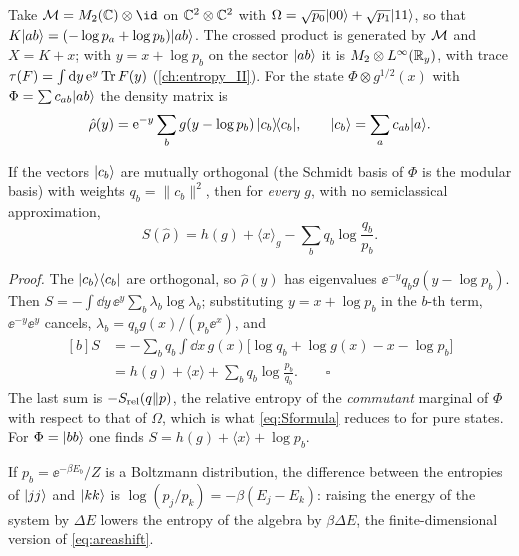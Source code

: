 Take $\M=M_2(\C)\otimes\id$ on $\mathbb{C}^2\otimes\mathbb{C}^2$ with $\Omega=\sqrt{p_0}\lvert 00\rangle+\sqrt{p_1}\lvert 11\rangle$, so that $K\lvert ab\rangle=(-\log p_a+\log p_b)\lvert ab\rangle$. The crossed product is generated by $\mathcal{M}$ and $X=K+x$; with $y=x+\log p_b$ on the sector $\lvert ab\rangle$ it is $M_2\otimes L^\infty(\mathbb{R}_y)$, with trace $\tau(F)=\int\mathrm{d} y\,\mathrm{e}^{y}\operatorname{Tr} F(y)$ (\cref{ch:entropy_II}). For the state $\Phi\otimes g^{1/2}(x)$ with $\Phi=\sum c_{ab}\lvert ab\rangle$ the density matrix is
\begin{equation}
\hat\rho(y)=\mathrm{e}^{-y}\sum_bg(y-\log p_b)\,\lvert c_b\rangle\!\langle c_b\rvert,\qquad\lvert c_b\rangle=\sum_ac_{ab}\lvert a\rangle.\label{eq:rhoqubit}
\end{equation}

\begin{proposition}
If the vectors $\lvert c_b\rangle$ are mutually orthogonal (the Schmidt basis of $\Phi$ is the modular basis) with weights $q_b=\|c_b\|^2$, then for \emph{every} $g$, with no semiclassical approximation,
\begin{equation}
S(\hat\rho)=h(g)+\langle x\rangle_g-\sum_bq_b\log\frac{q_b}{p_b}.
\end{equation}
\end{proposition}
\emph{Proof.} The $\lvert c_b\rangle\langle c_b\rvert$ are orthogonal, so $\hat\rho(y)$ has eigenvalues $\ee^{-y}q_bg(y-\log p_b)$. Then $S=-\int\dd y\,\ee^y\sum_b\lambda_b\log\lambda_b$; substituting $y=x+\log p_b$ in the $b$-th term, $\ee^{-y}\ee^{y}$ cancels, $\lambda_b=q_bg(x)/(p_b\ee^{x})$, and
\begin{equation}
\begin{aligned}[b]S&=-\sum_bq_b\int\dd x\,g(x)\big[\log q_b+\log g(x)-x-\log p_b\big]\\&=h(g)+\langle x\rangle+\sum_bq_b\log\frac{p_b}{q_b}.\qquad\square\end{aligned}
\end{equation}
The last sum is $-S_{\rm rel}(q\|p)$, the relative entropy of the \emph{commutant} marginal of $\Phi$ with respect to that of $\Omega$, which is what \eqref{eq:Sformula} reduces to for pure states. For $\Phi=\lvert bb\rangle$ one finds $S=h(g)+\langle x\rangle+\log p_b$.

If $p_b=\ee^{-\beta E_b}/Z$ is a Boltzmann distribution, the difference between the entropies of $\lvert jj\rangle$ and $\lvert kk\rangle$ is $\log(p_j/p_k)=-\beta(E_j-E_k)$: raising the energy of the system by $\Delta E$ lowers the entropy of the algebra by $\beta\Delta E$, the finite-dimensional version of \eqref{eq:areashift}.

